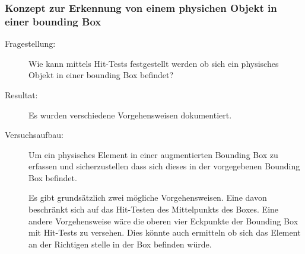 \subsubsection{Konzept zur Erkennung von einem physichen Objekt in einer bounding Box}
\begin{description}
    \item[Fragestellung:] Wie kann mittels Hit-Tests festgestellt werden ob sich ein physisches Objekt in einer bounding Box befindet?
	\item[Resultat:] Es wurden verschiedene Vorgehensweisen dokumentiert. 
    \item[Versuchsaufbau:] Um ein physisches Element in einer augmentierten Bounding Box zu erfassen und sicherzustellen dass sich dieses in der vorgegebenen Bounding Box befindet. 

    Es gibt grundsätzlich zwei mögliche Vorgehensweisen. Eine davon beschränkt sich auf das Hit-Testen des Mittelpunkts des Boxes. Eine andere Vorgehensweise wäre die oberen vier Eckpunkte der Bounding Box mit Hit-Tests zu versehen. Dies könnte auch ermitteln ob sich das Element an der Richtigen stelle in der Box befinden würde.


\end{description}